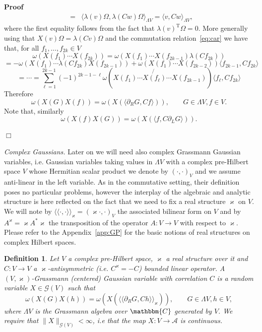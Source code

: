 \documentclass[11pt]{article}
\newcommand{\Tau}{\mathrm{T}}
\newcommand{\llangle}{{\langle\!\langle}}
\newcommand{\rrangle}{{\rangle\!\rangle}}
\newcommand{\tmtextit}[1]{{\itshape{#1}}}
\newenvironment{proof}{\noindent\textbf{Proof\ }}{\hspace*{\fill}$\Box$\medskip}
\newtheorem{definition}{Definition}
\begin{document}
\begin{proof}
\begin{eqnarray*}
    & = & \langle \lambda (v) \Omega, \lambda (C w) \Omega \rangle_{\Lambda
    V} = \langle v, C w \rangle_{\Lambda V},
  \end{eqnarray*}
  where the first equality follows from the fact that $\lambda (v)^{\Tau}
  \Omega = 0$. More generally using that $X (v) \Omega = \lambda (C v) \Omega$
  and the commutation relation~{\eqref{eq:car}} we have that, for all $f_1,
  \ldots, f_{2 k} \in V$
  \[ \omega (X (f_1) \cdots X (f_{2 k})) = \omega (X (f_1) \cdots X (f_{2 k -
     1}) \lambda (C f_{2 k})) \]
  \[ = - \omega (X (f_1) \cdots \lambda (C f_{2 k}) X (f_{2 k - 1})) + \omega
     (X (f_1) \cdots X (f_{2 k - 2})) \langle f_{2 k - 1}, C f_{2 k} \rangle
  \]
  \[ = \cdots = \sum_{\ell = 1}^{2 k - 1} (- 1)^{2 k - 1 - \ell} \omega \left(
     X (f_1) \cdots \not{X (f_{\ell})} \cdots X (f_{2 k - 1}) \right) \langle
     f_{\ell}, C f_{2 k} \rangle \]
  Therefore
  \[ \omega (X (G) X (f)) = \omega (X (\langle \partial_R G, C f \rangle)),
     \qquad G \in \Lambda V, f \in V. \]
  Note that, similarly
  \begin{equation}
    \omega (X (f) X (G)) = \omega (X (\langle f, C \partial_L G \rangle)) .
    \label{eq:ibp-l}
  \end{equation}
  
\end{proof}

\tmtextit{Complex Gaussians.} Later on we will need also complex Grassmann
Gaussian variables, i.e. Gaussian variables taking values in $\Lambda V$ with
a complex pre-Hilbert space $V$ whose Hermitian scalar product we denote by
$(\cdot, \cdot)_V$ and we assume anti-linear in the left variable. As in the
commutative setting, their definition poses no particular problems, however
the interplay of the algebraic and analytic structure is here reflected on the
fact that we need to fix a real structure $\varkappa$ on $V$. We will note by
$\llangle \cdot, \cdot \rrangle_{\varkappa} = (\varkappa \cdot, \cdot)_V$ the
associated bilinear form on $V$ and by $A^{\varkappa} = \varkappa A^{\ast}
\varkappa$ the transposition of the operator $A : V \rightarrow V$ with
respect to $\varkappa$. Please refer to the Appendix~\ref{app:GP} for the
basic notions of real structures on complex Hilbert spaces.

\begin{definition}
  \label{def:complex-gaussians}Let $V$ a complex pre-Hilbert space,
  $\varkappa$ a real structure over it and $C : V \rightarrow V$ a
  $\varkappa$-antisymmetric (i.e. $C^{\varkappa} = - C$) bounded linear
  operator. A \ $(V, \varkappa)$-Grassmann (centered) Gaussian variable with
  correlation $C$ is a random variable $X \in \mathcal{G} (V)$ such that
  \[ \omega (X (G) X (h)) = \omega (X (\llangle \partial_R G, C h
     \rrangle_{\varkappa})), \qquad G \in \Lambda V, h \in V, \]
  where $\Lambda V$ is the Grassmann algebra over $\mathbbm{C}$ generated by
  $V$. We require that $\| X \|_{\mathcal{G} (V)} < \infty$, i.e that the map
  $X : V \rightarrow \mathcal{A}$ is continuous.
\end{definition}
\end{document}
